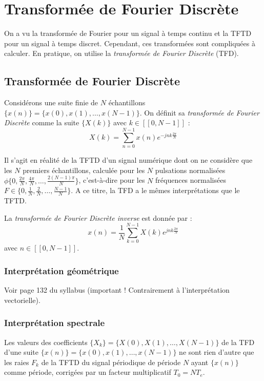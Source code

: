 \chapter{Transformée de Fourier Discrète}
    On a vu la transformée de Fourier pour un signal à temps continu et la TFTD pour un signal à temps discret. Cependant, ces transformées sont compliquées à calculer. En pratique, on utilise la \textit{transformée de Fourier Discrète} (TFD).

    \section{Transformée de Fourier Discrète}
        Considérons une suite finie de $N$ échantillons $\{x(n)\} = \{x(0), x(1), \dots, x(N-1)\}$. On définit sa \textit{transformée de Fourier Discrète} comme la suite $\{X(k)\}$ avec $k \in [[0, N-1]]$ :
        $$
            X(k) = \sum_{n=0}^{N-1} x(n)e^{-jnk\frac{2\pi}{N}}
        $$

        Il s'agit en réalité de la TFTD d'un signal numérique dont on ne considère que les $N$ premiers échantillons, calculée pour les $N$ pulsations normalisées $\phi \{0, \frac{2\pi}{N}, \frac{4\pi}{N}, \dots, \frac{2(N-1)\pi}{N}\}$, c'est-à-dire pour les $N$ fréquences normalisées $F \in \{0, \frac{1}{N}, \frac{2}{N}, \dots, \frac{N-1}{N}\}$. A ce titre, la TFD a le mêmes interprétations que le TFTD.

        La \textit{transformée de Fourier Discrète inverse} est donnée par :
        $$
            x(n) = \frac{1}{N}\sum_{k=0}^{N-1} X(k)e^{jnk\frac{2\pi}{N}}
        $$
        avec $n \in [[0, N-1]]$.

        \subsection{Interprétation géométrique}
            Voir page 132 du syllabus (important ! Contrairement à l'interprétation vectorielle).

        \subsection{Interprétation spectrale}
            Les valeurs des coefficients $\{X_k\} = \{X(0), X(1), \dots, X(N-1)\}$ de la TFD d'une suite $\{x(n)\} = \{x(0), x(1), \dots, x(N-1)\}$ ne sont rien d'autre que les raies $F_k$ de la TFTD du signal périodique de période $N$ ayant $\{x(n)\}$ comme période, corrigées par un facteur multiplicatif $T_0 = NT_e$.

